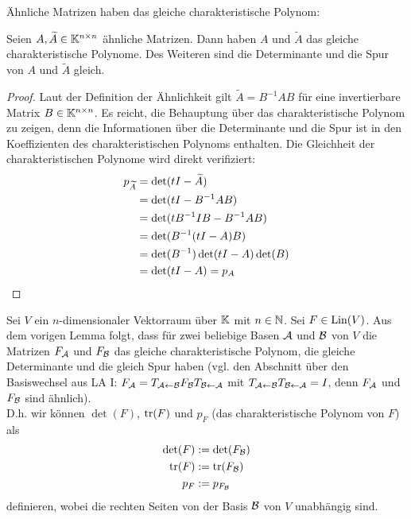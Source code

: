 Ähnliche Matrizen haben das gleiche charakteristische Polynom: 

\begin{lm}
	Seien $ A, \widetilde{A} \in \mathbb K^{n \times n} $ ähnliche Matrizen. Dann haben $ A $ und $ \widetilde{A} $ das gleiche charakteristische Polynome. Des Weiteren sind die Determinante und die Spur von $A$ und $\widetilde{A}$ gleich. 
\end{lm}
\begin{proof}
	Laut der Definition der Ähnlichkeit gilt  $ \widetilde{A} = B^{-1}AB $ für eine invertierbare Matrix $ B \in \mathbb K^{n \times n} $. 
	Es reicht, die Behauptung über das charakteristische Polynom zu zeigen, denn die Informationen über die Determinante und die Spur ist in den Koeffizienten des charakteristischen Polynoms enthalten. Die Gleichheit der charakteristischen Polynome wird direkt verifiziert: 
	\begin{align*}
		p_{\widetilde{A}} &= 
		 \det(tI - \widetilde{A}) 
		\\ &= \det(tI - B^{-1}AB)
		 \\
		&= \det(tB^{-1}IB - B^{-1}AB) 
		\\ &= \det(B^{-1}(tI - A)B) 
		\\
		&= \det(B^{-1}) \det(tI - A) \det(B) 
		\\ &= \det(tI - A) = p_A \qedhere
	\end{align*}
\end{proof}


 Sei $ V $ ein $ n $-dimensionaler Vektorraum über $ \mathbb K $ mit $ n \in \mathbb N $. Sei $ F \in \operatorname{Lin}(V) $. Aus dem vorigen Lemma folgt, dass für zwei beliebige Basen $ \mathcal{A} $ und $ \mathcal{B} $ von $ V $ die Matrizen $ F_{\mathcal{A}} $ und $ F_{\mathcal{B}} $ das gleiche charakteristische Polynom, die gleiche Determinante und die gleich Spur haben (vgl. den Abschnitt über den Basiswechsel aus LA I: $ F_{\mathcal{A}} = T_{\mathcal{A} \gets \mathcal{B}} F_{\mathcal{B}} T_{\mathcal{B} \gets \mathcal{A}} $ mit $ T_{\mathcal{A} \gets \mathcal{B}}T_{\mathcal{B} \gets \mathcal{A}} = I $, denn $ F_{\mathcal{A}} $ und $ F_{\mathcal{B}} $ sind ähnlich). \\[10pt]
%
D.h. wir können $ \det(F) $, $ \operatorname{tr}(F) $ und $ p_F $ (das charakteristische Polynom von $ F $) als
\begin{equation}
	\begin{aligned}
		\det(F) &:= \det(F_{\mathcal{B}}) \\
		\operatorname{tr}(F) &:= \operatorname{tr}(F_{\mathcal{B}}) \\
		p_F &:= p_{F_{\mathcal{B}}}
	\end{aligned}
\end{equation}
definieren, wobei die rechten Seiten von der Basis $ \mathcal{B} $ von $ V $ unabhängig sind.

